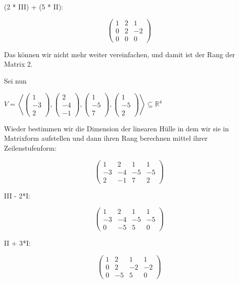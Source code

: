 \documentclass{article}
\begin{document}
(2 * III) + (5 * II):

\[
\begin{pmatrix}
    1 & 2 & 1 \\
    0 & 2 & -2 \\
    0 & 0 & 0
\end{pmatrix}
\]

Das können wir nicht mehr weiter vereinfachen, und damit ist der Rang der Matrix 2.

Sei nun

\(
V =
\left <
\begin{pmatrix}
    1 \\
    -3 \\
    2
\end{pmatrix}
,
\begin{pmatrix}
    2 \\
    -4 \\
    -1
\end{pmatrix}
,
\begin{pmatrix}
    1 \\
    -5 \\
    7
\end{pmatrix}
,
\begin{pmatrix}
    1 \\
    -5 \\
    2
\end{pmatrix}
\right >
\subseteq \mathbb{R^{4}}
\)

Wieder bestimmen wir die Dimension der linearen Hülle in dem wir sie in Matrixform aufstellen und dann ihren Rang berechnen mittel ihrer Zeilenstufenform:

\[
\begin{pmatrix}
    1 & 2 & 1 & 1 \\
    -3 & -4 & -5 & -5 \\
    2 & -1 & 7 & 2
\end{pmatrix}
\]

III - 2*I:

\[
\begin{pmatrix}
    1 & 2 & 1 & 1 \\
    -3 & -4 & -5 & -5 \\
    0 & -5 & 5 & 0
\end{pmatrix}
\]

II + 3*I:

\[
\begin{pmatrix}
    1 & 2 & 1 & 1 \\
    0 & 2 & -2 & -2 \\
    0 & -5 & 5 & 0
\end{pmatrix}
\]
\end{document}
